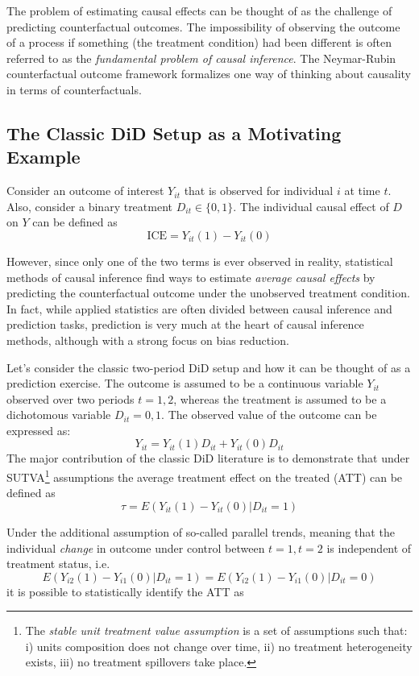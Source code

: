 \documentclass[hidelinks]{article}\usepackage[]{graphicx}\usepackage[]{color}
\begin{document}
The problem of estimating causal effects can be thought of as the challenge of predicting counterfactual outcomes. The impossibility of observing the outcome of a process if something (the treatment condition) had been different is often referred to as the \textit{fundamental problem of causal inference}. The Neymar-Rubin counterfactual outcome framework formalizes one way of thinking about causality in terms of counterfactuals. 

\subsection{The Classic DiD Setup as a Motivating Example}

Consider an outcome of interest $Y_{it}$ that is observed for individual $i$ at time $t$. Also, consider a binary treatment $D_{it} \in \{ 0, 1 \}$. The individual causal effect of $D$ on $Y$ can be defined as 
$$\text{ICE} = Y_{it}(1) - Y_{it}(0)$$

However, since only one of the two terms is ever observed in reality, statistical methods of causal inference find ways to estimate \textit{average causal effects} by predicting the counterfactual outcome under the unobserved treatment condition. In fact, while applied statistics are often divided between causal inference and prediction tasks, prediction is very much at the heart of causal inference methods, although with a strong focus on bias reduction.

Let's consider the classic two-period DiD setup and how it can be thought of as a prediction exercise. The outcome is assumed to be a continuous variable $Y_{it}$ observed over two periods $t=1, 2$, whereas the treatment is assumed to be a dichotomous variable $D_{it} = 0, 1$. The observed value of the outcome can be expressed as:
$$ Y_{it} = Y_{it}(1)D_{it} + Y_{it}(0)D_{it} $$
The major contribution of the classic DiD literature \parencite[e.g.,]{Angrist2009} is to demonstrate that under SUTVA\footnote{The \textit{stable unit treatment value assumption} is a set of assumptions such that: i) units composition does not change over time, ii) no treatment heterogeneity exists, iii) no treatment spillovers take place.} assumptions the average treatment effect on the treated (ATT) can be defined as
$$ \tau = E(Y_{it} (1) - Y_{it}(0) | D_{it} = 1) $$

Under the additional assumption of so-called parallel trends, meaning that the individual \textit{change} in outcome under control between $t = 1, t= 2$ is independent of treatment status, i.e.
$$ E(Y_{i2} (1) - Y_{i1}(0) | D_{it} = 1) = E(Y_{i2} (1) - Y_{i1}(0) | D_{it} = 0) $$
it is possible to statistically identify the ATT as
\end{document}
